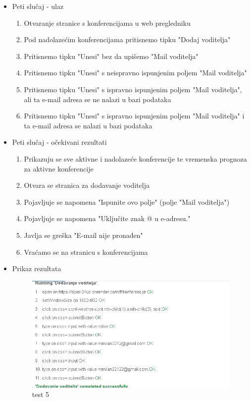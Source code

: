 			 \begin{itemize}
			 	\item Peti slučaj - ulaz
			 	\begin{enumerate}
			 		\item Otvaranje stranice s konferencijama u web pregledniku
			 		\item Pod nadolazećim konferencijama pritisnemo tipku "Dodaj voditelja"
			 		\item Pritisnemo tipku "Unesi" bez da upišemo "Mail voditelja"
			 		\item Pritisnemo tipku "Unesi" s neispravno ispunjenim poljem "Mail voditelja"
			 		\item Pritisnemo tipku "Unesi" s ispravno ispunjenim poljem "Mail voditelja", ali ta e-mail adresa se ne nalazi u bazi podataka
			 		\item Pritisnemo tipku "Unesi" s ispravno ispunjenim poljem "Mail voditelja" i ta e-mail adresa se nalazi u bazi podataka
			 	\end{enumerate}
			 	\item Peti slučaj - očekivani rezultati
			 	\begin{enumerate}
			 		\item Prikazuju se sve aktivne i nadolazeće konferencije te vremenska prognoza za aktivne konferencije
			 		\item Otvara se stranica za dodavanje voditelja
			 		\item Pojavljuje se napomena "Ispunite ovo polje" (polje "Mail voditelja")
			 		\item Pojavljuje se napomena "Uključite znak @ u e-adresu."
			 		\item Javlja se greška "E-mail nije pronađen"
			 		\item Vraćamo se na stranicu s konferencijama
			 	\end{enumerate}
			 	\item Prikaz rezultata
			 	\begin{figure}[htb]
			 		\centering
			 		\includegraphics[width=11cm]{slike/test_5.png}
			 		\caption{test 5}
			 		\label{fig:fer-logo}
			 	\end{figure}
			 \end{itemize}
			 
